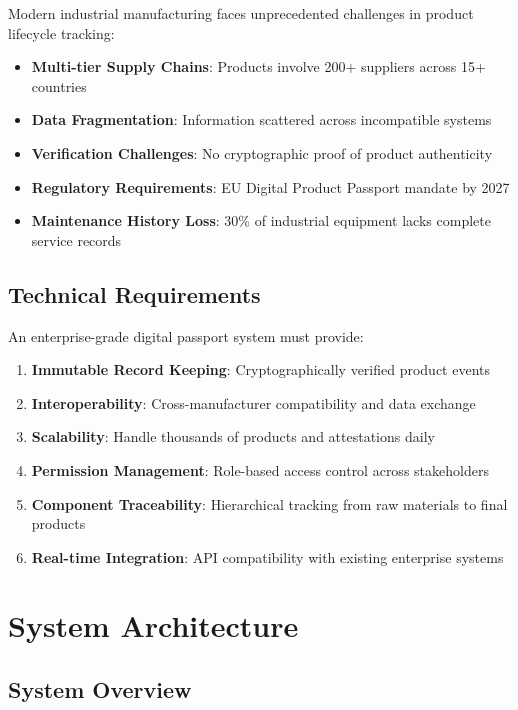 \documentclass[11pt,a4paper]{article}
\begin{document}
Modern industrial manufacturing faces unprecedented challenges in product lifecycle tracking:

\begin{itemize}[leftmargin=0.5cm]
    \item \textbf{Multi-tier Supply Chains}: Products involve 200+ suppliers across 15+ countries
    \item \textbf{Data Fragmentation}: Information scattered across incompatible systems
    \item \textbf{Verification Challenges}: No cryptographic proof of product authenticity
    \item \textbf{Regulatory Requirements}: EU Digital Product Passport mandate by 2027
    \item \textbf{Maintenance History Loss}: 30\% of industrial equipment lacks complete service records
\end{itemize}

\subsection{Technical Requirements}

An enterprise-grade digital passport system must provide:

\begin{enumerate}
    \item \textbf{Immutable Record Keeping}: Cryptographically verified product events
    \item \textbf{Interoperability}: Cross-manufacturer compatibility and data exchange
    \item \textbf{Scalability}: Handle thousands of products and attestations daily
    \item \textbf{Permission Management}: Role-based access control across stakeholders
    \item \textbf{Component Traceability}: Hierarchical tracking from raw materials to final products
    \item \textbf{Real-time Integration}: API compatibility with existing enterprise systems
\end{enumerate}

\section{System Architecture}

\subsection{System Overview}
\end{document}
